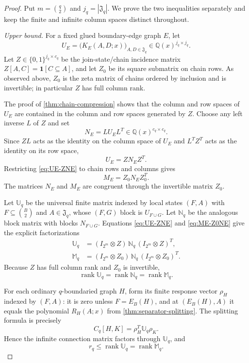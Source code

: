 \documentclass[11pt,reqno]{amsart}
\theoremstyle{definition}
\begin{document}
\begin{proof}
Put $m=\binom q2$ and $j_q=|\mathfrak J_q|$.  We prove the two inequalities
separately and keep the finite and infinite column spaces distinct throughout.

\emph{Upper bound.}
For a fixed glued boundary-edge graph $E$, let
\[
 U_E=\bigl(K_E(A,D;x)\bigr)_{A,D\in\mathfrak J_q}
 \in\mathbb Q(x)^{j_q\times j_q}.
\]
Let $Z\in\{0,1\}^{j_q\times c_q}$ be the join-state/chain incidence matrix
$Z[A,C]=\mathbf1[C\subseteq A]$, and let $Z_0$ be its square submatrix on
chain rows.  As observed above, $Z_0$ is the zeta matrix of chains ordered by
inclusion and is invertible; in particular $Z$ has full column rank.

The proof of \cref{thm:chain-compression} shows that the column and row spaces
of $U_E$ are contained in the column and row spaces generated by $Z$.  Choose
any left inverse $L$ of $Z$ and set
\[
 N_E=L U_E L^T\in\mathbb Q(x)^{c_q\times c_q}.
\]
Since $ZL$ acts as the identity on the column space of $U_E$ and
$L^TZ^T$ acts as the identity on its row space,
\begin{equation}\label{eq:UE-ZNE}
 U_E=ZN_EZ^T.
\end{equation}
Restricting \eqref{eq:UE-ZNE} to chain rows and columns gives
\begin{equation}\label{eq:ME-Z0NE}
 M_E=Z_0N_EZ_0^T.
\end{equation}
The matrices $N_E$ and $M_E$ are congruent through the invertible matrix $Z_0$.

Let $\mathbb U_q$ be the universal finite matrix indexed by local states
$(F,A)$ with $F\subseteq\binom B2$ and $A\in\mathfrak J_q$, whose
$(F,G)$ block is $U_{F\cup G}$.  Let $\mathbb N_q$ be the analogous block
matrix with blocks $N_{F\cup G}$.  Equations \eqref{eq:UE-ZNE} and
\eqref{eq:ME-Z0NE} give the explicit factorizations
\begin{align}
 \mathbb U_q
 &=(I_{2^m}\otimes Z)\,\mathbb N_q\,(I_{2^m}\otimes Z)^T,
 \label{eq:universal-state-factor}\\
 \mathbb M_q
 &=(I_{2^m}\otimes Z_0)\,\mathbb N_q\,(I_{2^m}\otimes Z_0)^T.
 \label{eq:chain-state-factor}
\end{align}
Because $Z$ has full column rank and $Z_0$ is invertible,
\[
 \operatorname{rank}\mathbb U_q
 =\operatorname{rank}\mathbb N_q
 =\operatorname{rank}\mathbb M_q.
\]

For each ordinary $q$-boundaried graph $H$, form its finite response vector
$\rho_H$ indexed by $(F,A)$: it is zero unless $F=E_B(H)$, and at
$(E_B(H),A)$ it equals the polynomial $R_H(A;x)$ from
\cref{thm:separator-splitting}.  The splitting formula is precisely
\[
 C_q[H,K]=\rho_H^T\mathbb U_q\rho_K.
\]
Hence the infinite connection matrix factors through $\mathbb U_q$, and
\[
 r_q\le\operatorname{rank}\mathbb U_q
 =\operatorname{rank}\mathbb M_q.
\]


\end{proof}
\end{document}
